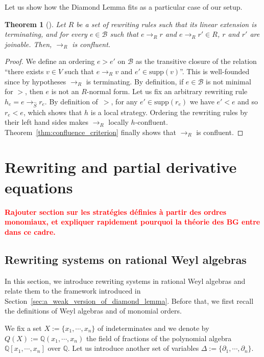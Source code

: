 \documentclass[10pt]{easychair}
\newtheorem{theorem}{Theorem}[section]
\theoremstyle{definition}
\newcommand\todo[1]{{\bf\textcolor{red}{#1.}}}
\newcommand\supp{\text{supp}}
\newcommand\diff[1]{\partial_{#1}}
\newcommand\basis{\mathscr{B}}
\newcommand\Q{\mathbb{Q}}
\newcommand\QX{\mathbb{Q}[x_1,\cdots,x_n]}
\newcommand\QXX{\mathbb{Q}(x_1,\cdots,x_n)}
\newcommand\rewR{\to_R}
\newcommand\rewS{\to_{\hat{S}}}
\begin{document}
Let us show how the Diamond Lemma fits as a particular case of our setup.
\smallskip

\begin{theorem}[\cite{MR506890}]\label{thm:diamond_lemma}
  Let $R$ be a set of rewriting rules such that its linear extension is
  terminating, and for every $e\in\basis$ such that $e\rewR r$ and
  $e\rewR r'\in R$, $r$ and $r'$ are joinable. Then, $\rewR$ is
  confluent.
\end{theorem}

\begin{proof}
  We define an ordering $e>e'$ on $\basis$ as the transitive closure of
  the relation ``there exists $v\in V$ such that $e\rewR v$ and
  $e'\in\supp(v)$''. This is well-founded since by hypotheses $\rewR$ is
  terminating. By definition, if $e\in\basis$ is not minimal for $>$,
  then $e$ is not an $R$-normal form. Let us fix an arbitrary rewriting
  rule $h_e=e\rewS r_e$.  By definition of~$>$, for any $e'\in\supp(r_e)$
  we have $e'<e$ and so $r_e<e$, which shows that $h$ is a local
  strategy. Ordering the rewriting rules by their left hand sides makes
  $\rewR$ locally $h$-confluent. Theorem~\ref{thm:confluence_criterion}
  finally shows that $\rewR$ is confluent.   
\end{proof}

\section{Rewriting and partial derivative equations}
\label{sec:rewriting_systems_and_partial_derivative_equations}

\todo{Rajouter section sur les stratégies définies à partir des ordres
  monomiaux, et expliquer rapidement pourquoi la théorie des BG entre
  dans ce cadre}

\subsection{Rewriting systems on rational Weyl algebras}
\label{sec:rewriting_systems_on_Weyl_algebras}

In this section, we introduce rewriting systems in rational Weyl algebras
and relate them to the framework introduced in
Section~\ref{sec:a_weak_version_of_diamond_lemma}. Before that, we first
recall the definitions of Weyl algebras and of monomial orders.
\medskip

We fix a set $X:=\{x_1,\cdots,x_n\}$ of indeterminates and we denote by
$Q(X):=\QXX$ the field of fractions of the polynomial algebra $\QX$ over
$\Q$. Let us introduce another set of variables
$\Delta:=\{\diff{1},\cdots,\diff{n}\}$. 
\end{document}
